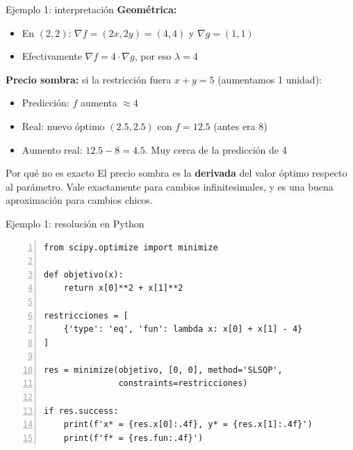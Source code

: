 \documentclass{beamer}
\begin{document}
\begin{frame}{Ejemplo 1: interpretación}
    \small
    \textbf{Geométrica:}
    \begin{itemize}
        \item En $(2, 2)$: $\nabla f = (2x, 2y) = (4, 4)$ y $\nabla g = (1, 1)$
        \item Efectivamente $\nabla f = 4 \cdot \nabla g$, por eso $\lambda = 4$
    \end{itemize}

    \vspace{0.5em}

    \textbf{Precio sombra:} si la restricción fuera $x + y = 5$ (aumentamos 1 unidad):
    \begin{itemize}
        \item Predicción: $f$ aumenta $\approx 4$
        \item Real: nuevo óptimo $(2.5, 2.5)$ con $f = 12.5$ (antes era 8)
        \item Aumento real: $12.5 - 8 = 4.5$. Muy cerca de la predicción de 4
    \end{itemize}

    \vspace{0.5em}

    \begin{alertblock}{Por qué no es exacto}
        El precio sombra es la \textbf{derivada} del valor óptimo respecto al parámetro. Vale exactamente para cambios infinitesimales, y es una buena aproximación para cambios chicos.
    \end{alertblock}
\end{frame}

\begin{frame}[fragile]{Ejemplo 1: resolución en Python}
    \begin{lstlisting}[numbers=left, numbersep=5pt]
from scipy.optimize import minimize

def objetivo(x):
    return x[0]**2 + x[1]**2

restricciones = [
    {'type': 'eq', 'fun': lambda x: x[0] + x[1] - 4}
]

res = minimize(objetivo, [0, 0], method='SLSQP',
               constraints=restricciones)

if res.success:
    print(f'x* = {res.x[0]:.4f}, y* = {res.x[1]:.4f}')
    print(f'f* = {res.fun:.4f}')
    \end{lstlisting}
\end{frame}

\end{document}
